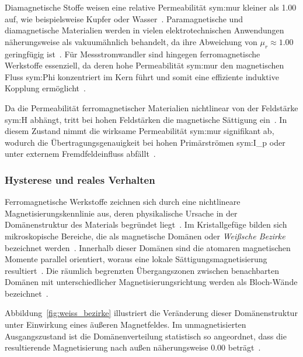 Diamagnetische Stoffe weisen eine relative Permeabilität \gls{sym:mur} kleiner als \num{1,00} auf, wie beispielsweise Kupfer oder Wasser~\cite[Tab.~48]{book-Taschenbuch_Physik-Kuchling}. Paramagnetische und diamagnetische Materialien werden in vielen elektrotechnischen Anwendungen näherungsweise als vakuumähnlich behandelt, da ihre Abweichung von $\mu_r \approx \num{1,00}$ geringfügig ist~\cite[Tab.~48]{book-Taschenbuch_Physik-Kuchling}. Für Messstromwandler sind hingegen ferromagnetische Werkstoffe essenziell, da deren hohe Permeabilität \gls{sym:mur} den magnetischen Fluss \gls{sym:Phi} konzentriert im Kern führt und somit eine effiziente induktive Kopplung ermöglicht~\cite[S.~63]{book-Technologie_Messwandler-Minkner}.

Da die Permeabilität ferromagnetischer Materialien nichtlinear von der Feldstärke \gls{sym:H} abhängt, tritt bei hohen Feldstärken die magnetische Sättigung ein~\cite[Kap.~11]{book-Magnetisches_Feld_Moeller-Harriehausen}. In diesem Zustand nimmt die wirksame Permeabilität \gls{sym:mur} signifikant ab, wodurch die Übertragungsgenauigkeit bei hohen Primärströmen \gls{sym:I_p} oder unter externem Fremdfeldeinfluss abfällt~\cite[S.~73]{book-Technologie_Messwandler-Minkner}.

\subsubsection{Hysterese und reales Verhalten}
\label{sec:hysterese-und-reales_verhalten}

Ferromagnetische Werkstoffe zeichnen sich durch eine nichtlineare Magnetisierungskennlinie aus, deren physikalische Ursache in der Domänenstruktur des Materials begründet liegt~\cite[Kap.~11]{book-Magnetisches_Feld_Moeller-Harriehausen}. Im Kristallgefüge bilden sich mikroskopische Bereiche, die als magnetische Domänen oder \textit{Weißsche Bezirke} bezeichnet werden~\cite[Kap.~11]{book-Magnetisches_Feld_Moeller-Harriehausen}. Innerhalb dieser Domänen sind die atomaren magnetischen Momente parallel orientiert, woraus eine lokale Sättigungsmagnetisierung resultiert~\cite[Kap.~11]{book-Magnetisches_Feld_Moeller-Harriehausen}. Die räumlich begrenzten Übergangszonen zwischen benachbarten Domänen mit unterschiedlicher Magnetisierungsrichtung werden als Bloch-Wände bezeichnet~\cite[Kap.~11]{book-Magnetisches_Feld_Moeller-Harriehausen}.



Abbildung~\ref{fig:weiss_bezirke} illustriert die Veränderung dieser Domänenstruktur unter Einwirkung eines äußeren Magnetfeldes. Im unmagnetisierten Ausgangszustand ist die Domänenverteilung statistisch so angeordnet, dass die resultierende Magnetisierung nach außen näherungsweise \num{0,00} beträgt~\cite[Kap.~11]{book-Magnetisches_Feld_Moeller-Harriehausen}.


